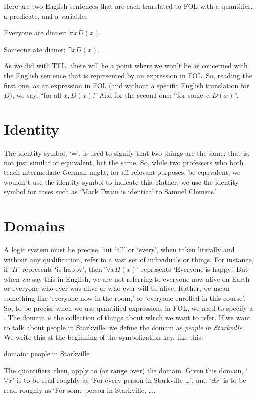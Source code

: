 Here are two English sentences that are each translated to FOL with a quantifier, a predicate, and a variable:

\begin{ebullet}
	\item[] Everyone ate dinner: $\forall x D(x)$. 
	\item[] Someone ate dinner: $\exists x D(x)$.
\end{ebullet}

As we did with TFL, there will be a point where we won’t be as concerned with the English sentence that is represented by an expression in FOL. So, reading the first one, as an expression in FOL (and without a specific English translation for $D$), we say, ``for all $x, D(x)$.” And for the second one: “for some $x, D(x)$”. 


\section{Identity}

The identity symbol, `=’, is used to signify that two things are the same; that is, not just similar or equivalent, but the same. So, while two professors who both teach intermediate German might, for all relevant purposes, be equivalent, we wouldn’t use the identity symbol to indicate this. Rather, we use the identity symbol for cases such as `Mark Twain is identical to Samuel Clemens.’ 


\section{Domains}

A logic system must be precise, but `all’ or `every’, when taken literally and without any qualification, refer to a vast set of individuals or things. For instance, if `$H$' represents `is happy’, then ‘$\forall x H(x)$’ represents ‘Everyone is happy’. But when we say this in English, we are not referring to everyone now alive on Earth or everyone who ever was alive or who ever will be alive. Rather, we mean something like `everyone now in the room,’ or `everyone enrolled in this course’. 
So, to be precise when we use quantified expressions in FOL, we need to specify a . The domain is the collection of things about which we want to refer. If we want to talk about people in Starkville, we define the domain as \textit{people in Starkville}. We write this at the beginning of the symbolization key, like this:

\begin{earg}
\item[] domain: people in Starkville
\end{earg}
The quantifiers, then, apply to (or range over) the domain. Given this domain, ‘$\forall x$’ is to be read roughly as ‘For every person in Starkville \ldots ’, and ‘$\exists x$’ is to be read roughly as ‘For some person in Starkville, \ldots ’.

